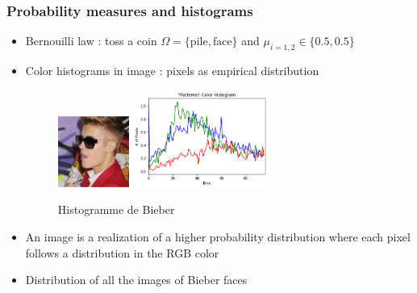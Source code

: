 \documentclass[french,9pt]{beamer}
\begin{document}
\begin{frame}
\frametitle{Probability measures and histograms}

\begin{itemize}
\item Bernouilli law : toss a coin $\Omega=\{\text{pile},\text{face}\}$ and $\mu_{i=1,2} \in \{0.5,0.5\}$
\item Color histograms in image : pixels as empirical distribution
\begin{figure}
  \begin{center}
    \includegraphics[width=0.22\textwidth]{fig/biber.png}\hspace{1mm}
     \includegraphics[width=0.42\textwidth]{fig/hist_biber.png}
  \end{center}
 \caption{Histogramme de Bieber}
\end{figure}
\item An image is a realization of a higher probability distribution where each pixel follows a distribution in the RGB color
\item Distribution of all the images of Bieber faces 
\end{itemize}
\end{frame}

\end{document}
